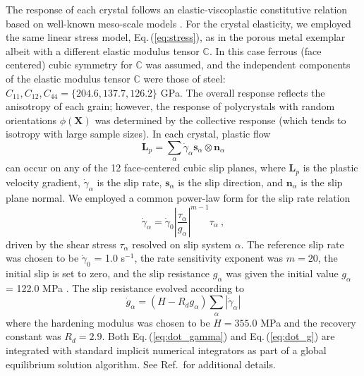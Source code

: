 \documentclass[12pt,reqno]{article}
\newcommand{\ADD}[1]{{#1}}
\newcommand{\eref}[1]{Eq.\,(\ref{#1})}
\newcommand{\cref}[1]{Ref.\,\cite{#1}}
\newcommand{\Cbb}{\mathbb{C}}
\newcommand{\nb}{\mathbf{n}}
\renewcommand{\sb}{\mathbf{s}}
\newcommand{\Lb}{\mathbf{L}}
\newcommand{\Xb}{\mathbf{X}}
\begin{document}
The response of each crystal follows an elastic-viscoplastic constitutive relation based on well-known meso-scale models \cite{taylor1934mechanism,kroner1961plastic,bishop1951xlvi,bishop1951cxxviii,mandel1965generalisation,dawson2000computational,roters2010overview}.
For the crystal elasticity, we employed the same linear stress model, \eref{eq:stress}, as in the porous metal exemplar albeit with a different elastic modulus tensor $\Cbb$.
In this case ferrous (face centered) cubic symmetry for $\Cbb$ was assumed, and the independent components of the elastic modulus tensor $\Cbb$ were those of steel: $C_{11}, C_{12}, C_{44} = \{204.6, 137.7, 126.2\}$ GPa.
The overall response reflects the anisotropy of each grain; however, the response of polycrystals with random orientations $\phi(\Xb)$ was determined by the collective response (which tends to isotropy with large sample sizes).
In each crystal, plastic flow
\begin{equation}
\Lb_p = \sum_\alpha \dot{\gamma}_{\alpha} \sb_\alpha \otimes \nb_\alpha
\end{equation}
can occur on any of the 12 face-centered cubic slip planes, where $\Lb_p$ is the plastic velocity gradient, $\dot{\gamma}_{\alpha}$ is the slip rate, $\sb_\alpha$ is the slip direction, and $\nb_\alpha$ is the slip plane normal.
We employed a common power-law form for the slip rate relation
\begin{equation} \label{eq:dot_gamma}
\dot{\gamma}_{\alpha}=\dot{\gamma}_0\left|\frac{\tau_{\alpha}}{g_{\alpha}}\right|^{m-1}\tau_{\alpha} \ ,
\end{equation}
driven by the shear stress $\tau_\alpha$ resolved on slip system $\alpha$.
The reference slip rate was chosen to be $\dot{\gamma}_0$ = 1.0 s$^{-1}$, the rate sensitivity exponent was $m = 20$, \ADD{the initial slip is set to zero}, and the slip resistance $g_{\alpha}$ was given the initial value $g_{\alpha}$ = 122.0 MPa \cite{jones2018machine}.
The slip resistance evolved according to \cite{Kocks1976, mecking1976hardening}
\begin{equation} \label{eq:dot_g}
\dot{g}_\alpha = (H-R_d g_\alpha) \sum_\alpha |\dot{\gamma}_\alpha|
\end{equation}
where the hardening modulus was chosen to be $H = 355.0$ MPa and the recovery constant was $R_d = 2.9$.
\ADD{Both \eref{eq:dot_gamma} and \eref{eq:dot_g} are integrated with standard implicit numerical integrators as part of a global equilibrium solution algorithm.
See \cref{jones2018machine} for additional details.
}
\end{document}
